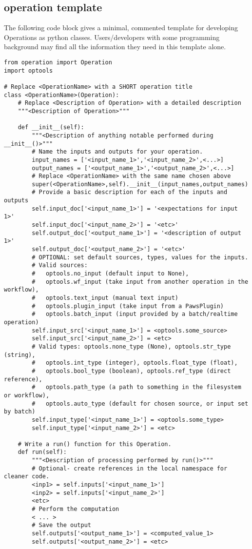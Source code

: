 \subsection{operation template}
\label{sec:template}

The following code block gives a minimal, 
commented template for developing
Operations as python classes.
Users/developers with some programming background
may find all the information they need in this template alone.

\lstset{language=Python}
\begin{lstlisting}
from operation import Operation
import optools

# Replace <OperationName> with a SHORT operation title 
class <OperationName>(Operation):
    # Replace <Description of Operation> with a detailed description 
    """<Description of Operation>"""

    def __init__(self):
        """<Description of anything notable performed during __init__()>"""
        # Name the inputs and outputs for your operation.
        input_names = ['<input_name_1>','<input_name_2>',<...>]
        output_names = ['<output_name_1>','<output_name_2>',<...>]
        # Replace <OperationName> with the same name chosen above
        super(<OperationName>,self).__init__(input_names,output_names)
        # Provide a basic description for each of the inputs and outputs 
        self.input_doc['<input_name_1>'] = '<expectations for input 1>'
        self.input_doc['<input_name_2>'] = '<etc>'
        self.output_doc['<output_name_1>'] = '<description of output 1>'
        self.output_doc['<output_name_2>'] = '<etc>'
        # OPTIONAL: set default sources, types, values for the inputs.
        # Valid sources:
        #   optools.no_input (default input to None), 
        #   optools.wf_input (take input from another operation in the workflow), 
        #   optools.text_input (manual text input)
        #   optools.plugin_input (take input from a PawsPlugin)
        #   optools.batch_input (input provided by a batch/realtime operation)
        self.input_src['<input_name_1>'] = <optools.some_source>
        self.input_src['<input_name_2>'] = <etc>
        # Valid types: optools.none_type (None), optools.str_type (string), 
        #   optools.int_type (integer), optools.float_type (float), 
        #   optools.bool_type (boolean), optools.ref_type (direct reference),
        #   optools.path_type (a path to something in the filesystem or workflow), 
        #   optools.auto_type (default for chosen source, or input set by batch)
        self.input_type['<input_name_1>'] = <optools.some_type>
        self.input_type['<input_name_2>'] = <etc>
        
    # Write a run() function for this Operation.
    def run(self):
        """<Description of processing performed by run()>"""
        # Optional- create references in the local namespace for cleaner code.
        <inp1> = self.inputs['<input_name_1>']
        <inp2> = self.inputs['<input_name_2>']
        <etc>
        # Perform the computation
        < ... >
        # Save the output
        self.outputs['<output_name_1>'] = <computed_value_1>
        self.outputs['<output_name_2>'] = <etc>
\end{lstlisting}


